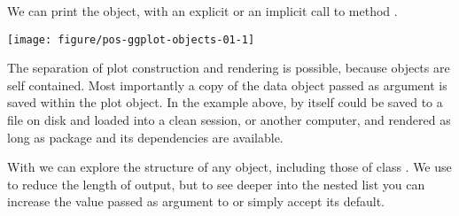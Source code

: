 \documentclass[krantz2]{krantz}\usepackage{knitr}%
\begin{document}
\begin{knitrout}\footnotesize
{}\color{fgcolor}\begin{kframe}
\begin{alltt}
 \hlkwb{<-} \hlstd{(} 
       \hlstd{(}    \hlopt{+}
  \hlstd{()}
\end{alltt}
\end{kframe}
\end{knitrout}

We can print the object, with an explicit or an implicit call to method .
\begin{knitrout}\footnotesize
{}\color{fgcolor}\begin{kframe}
\begin{alltt}
\end{alltt}
\end{kframe}

{\centering \texttt{[image: figure/pos-ggplot-objects-01-1]} 

}



\end{knitrout}

\begin{warningbox}
  The separation of plot construction and rendering is possible, because  objects are self contained. Most importantly a copy of the data object passed as argument is saved within the plot object. In the example above,  by itself could be saved to a file on disk and loaded into a clean session, or another computer, and rendered as long as package \ggplot and its dependencies are available.

  With  we can explore the structure of any \Rlang object, including those of class . We use  to reduce the length of output, but to see deeper into the nested list you can increase the value passed as argument to  or simply accept its default.

\begin{knitrout}\footnotesize
{}\color{fgcolor}\begin{kframe}
\begin{alltt}
  \hlstd{=} \hlstd{)}
\end{alltt}
\end{kframe}
\end{knitrout}
\end{warningbox}
\end{document}
